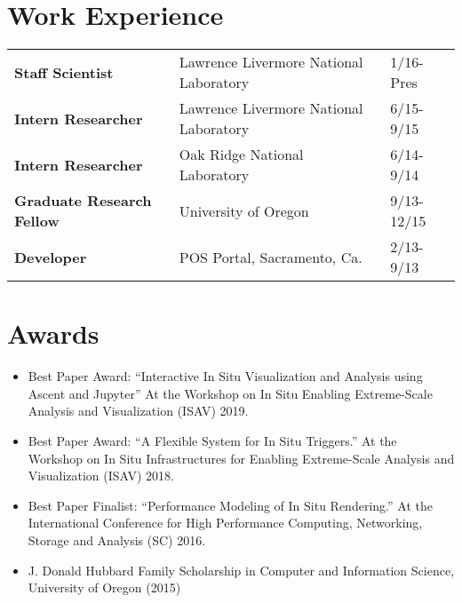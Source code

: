 \documentclass[margin,line]{res}
\begin{document}
\begin{resume}
\section{\sc Work Experience}

\begin{tabular}{lll}
\textbf{Staff Scientist}	& Lawrence Livermore National Laboratory & 1/16-Pres \\
\textbf{Intern Researcher}	& Lawrence Livermore National Laboratory & 6/15-9/15 \\
\textbf{Intern Researcher}	& Oak Ridge National Laboratory & 6/14-9/14 \\
\textbf{Graduate Research Fellow}	& University of Oregon  & 9/13-12/15 \\
\textbf{Developer}	& POS Portal, Sacramento, Ca.  & 2/13-9/13 \\
\end{tabular}


\section{\sc Awards}
\begin{itemize}
	\item Best Paper Award: “Interactive In Situ Visualization and Analysis using Ascent and Jupyter”
  At the Workshop on In Situ Enabling Extreme-Scale Analysis and Visualization (ISAV) 2019.
	\item Best Paper Award: “A Flexible System for In Situ Triggers.” At the Workshop on In Situ
	Infrastructures for Enabling Extreme-Scale Analysis and Visualization (ISAV) 2018.
	\item Best Paper Finalist: “Performance Modeling of In Situ Rendering.” At the International Conference
	for High Performance Computing, Networking, Storage and Analysis (SC) 2016.
	\item J. Donald Hubbard Family Scholarship in Computer and Information Science, University of Oregon (2015)
\end{itemize}



\end{resume}
\end{document}
